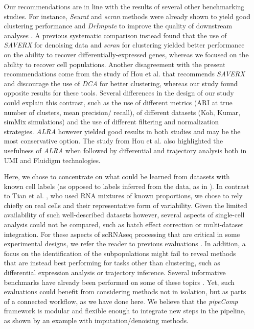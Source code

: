 \documentclass{bmcart}
\begin{document}
Our recommendations are in line with the results of several other benchmarking studies. For instance, \textit{Seurat} and \textit{scran} methods were already shown to yield good clustering performance \cite{freytagComparison2018} and \textit{DrImpute} to improve the quality of downstream analyses \cite{ZhangImput2018}. A previous systematic comparison \cite{viethSystematic2019} instead found that the use of \textit{SAVERX} for denoising data and \textit{scran} for clustering yielded better performance on the ability to recover differentially-expressed genes, whereas we focused on the ability to recover cell populations. Another disagreement with the present recommendations come from the study of Hou et al. \cite{HouImput2020} that recommends \textit{SAVERX} and discourage the use of \textit{DCA} for better clustering, whereas our study found opposite results for these tools. Several differences in the design of our study could explain this contrast, such as the use of different metrics (ARI at true number of clusters, mean precision/ recall), of different datasets (Koh, Kumar, simMix simulations) and the use of different filtering and normalization strategies. \textit{ALRA} however yielded good results in both studies and may be the most conservative option. The study from Hou et al. also highlighted the usefulness of \textit{ALRA} when followed by differential and trajectory analysis both in UMI and Fluidigm technologies. 

Here, we chose to concentrate on what could be learned from datasets with known cell labels (as opposed to labels inferred from the data, as in \cite{MereuCellAtlas2019}). In contrast to Tian et al. \cite{tianMixology2018}, who used RNA mixtures of known proportions, we chose to rely chiefly on real cells and their representative form of variability. Given the limited availability of such well-described datasets however, several aspects of single-cell analysis could not be compared, such as batch effect correction or multi-dataset integration. For these aspects of scRNAseq processing that are critical in some experimental designs, we refer the reader to previous evaluations \cite{TranBatch2020, StuartIntegration2019}. In addition, a focus on the identification of the subpopulations might fail to reveal methods that are instead best performing for tasks other than clustering, such as differential expression analysis or trajectory inference. Several informative benchmarks have already been performed on some of these topics \cite{CrowellMuscat2019, DalMolinDE2017, JaakkolaDE2017, SaelensTraject2019, SonesonDE2018, WangDE2019}. Yet, such evaluations could benefit from considering methods not in isolation, but as parts of a connected workflow, as we have done here. We believe that the \textit{pipeComp} framework is modular and flexible enough to integrate new steps in the pipeline, as shown by an example with imputation/denoising methods.
\end{document}
